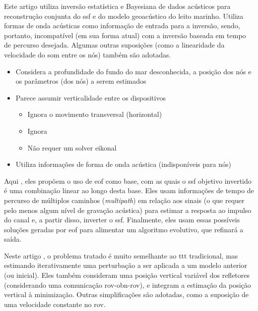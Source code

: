
Este artigo \cite{dosso_joint_2023} utiliza inversão estatística e Bayesiana de dados acústicos para reconstrução conjunta do \gls{ssf} e do modelo geoacústico do leito marinho. Utiliza formas de onda acústicas como informação de entrada para a inversão, sendo, portanto, incompatível (em sua forma atual) com a inversão baseada em tempo de percurso desejada. Algumas outras suposições (como a linearidade da velocidade do som entre os nós) também são adotadas.

\begin{itemize}
	\item Considera a profundidade do fundo do mar desconhecida, a posição dos nós e os parâmetros (dos nós) a serem estimados
	\item Parece assumir verticalidade entre os dispositivos
	\begin{itemize}
		\item Ignora o movimento transversal (horizontal)
		\item Ignora 
		\item Não requer um solver eikonal
	\end{itemize}
	\item Utiliza informações de forma de onda acústica (indisponíveis para nós)
\end{itemize}


Aqui \cite{radhakrishnan_inversion_2024}, eles propõem o uso de \gls{eof} como base, com as quais o \gls{ssf} objetivo invertido é uma combinação linear ao longo desta base. Eles usam informações de tempo de percurso de múltiplos caminhos (\textsl{multipath}) em relação aos sinais (o que requer pelo menos algum nível de gravação acústica) para estimar a resposta ao impulso do canal e, a partir disso, inverter o \gls{ssf}. Finalmente, eles usam essas possíveis soluções geradas por \gls{eof} para alimentar um algoritmo evolutivo, que refinará a saída.


Neste artigo \cite{ritter_water_2010}, o problema tratado é muito semelhante ao \gls{ttt} tradicional, mas estimando iterativamente uma perturbação a ser aplicada a um modelo anterior (ou inicial). Eles também consideram uma posição vertical variável dos refletores (considerando uma comunicação \gls{rov}-\gls{obn}-\gls{rov}), e integram a estimação da posição vertical à minimização. Outras simplificações são adotadas, como a suposição de uma velocidade constante no \gls{rov}.

